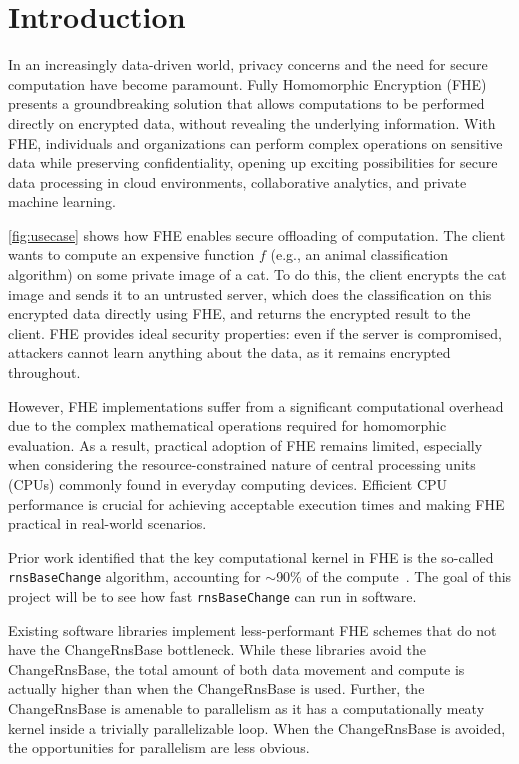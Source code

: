 \section{Introduction}\label{sec:introduction}


In an increasingly data-driven world, privacy concerns and the need for secure
computation have become paramount. Fully Homomorphic Encryption (FHE) presents
a groundbreaking solution that allows computations to be performed directly on
encrypted data, without revealing the underlying information. With FHE,
individuals and organizations can perform complex operations on sensitive data
while preserving confidentiality, opening up exciting possibilities for secure
data processing in cloud environments, collaborative analytics, and private
machine learning.


\autoref{fig:usecase} shows how FHE enables secure offloading of computation.
The client wants to compute an expensive function $f$ (e.g., an animal classification
algorithm) on some private image of a cat. To do this, the client encrypts the cat image and
sends it to an untrusted server, which does the classification on this encrypted data
directly using FHE, and returns the encrypted result to the client.
FHE provides ideal security properties: even if the server is compromised,
attackers cannot learn anything about the data, as it remains encrypted
throughout.

However, FHE implementations suffer from a significant computational overhead
due to the complex mathematical operations required for
homomorphic evaluation. As a result, practical adoption of FHE remains
limited, especially when considering the resource-constrained nature of central
processing units (CPUs) commonly found in everyday computing devices. Efficient
CPU performance is crucial for achieving acceptable execution times and making
FHE practical in real-world scenarios.

\figUsecase

Prior work identified that the key computational kernel in FHE is the so-called
\verb!rnsBaseChange! algorithm, accounting for $\sim$90\% of the
compute~\cite{samardzic:isca22:craterlake}. The goal of this project will be to
see how fast \verb!rnsBaseChange! can run in software.

Existing software libraries implement less-performant FHE schemes that do not
have the ChangeRnsBase bottleneck.
While these libraries avoid the
ChangeRnsBase, the total amount of both data movement and compute is actually
higher than when the ChangeRnsBase is used\cite{samardzic:isca22:craterlake}.
Further, the ChangeRnsBase is amenable to parallelism as it has a
computationally meaty kernel inside a trivially parallelizable loop.
When the ChangeRnsBase is avoided, the opportunities for parallelism are less
obvious.

